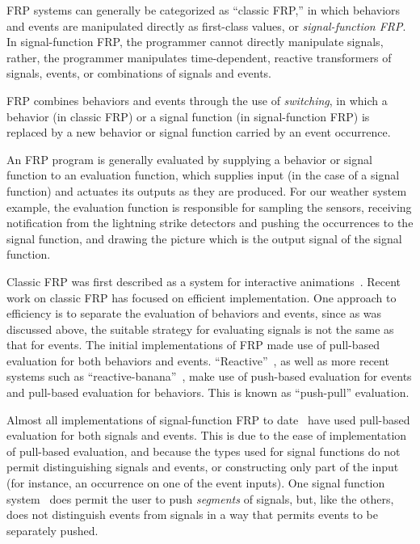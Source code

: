 FRP systems can generally be categorized as ``classic FRP,'' in which behaviors
and events are manipulated directly as first-class values,
or {\em signal-function FRP}. In signal-function FRP, the programmer cannot
directly manipulate signals, rather, the programmer manipulates time-dependent,
reactive transformers of signals, events, or combinations of signals and events.

FRP combines behaviors and events through the use of {\em switching}, in which
a behavior (in classic FRP) or a signal function (in signal-function FRP) is
replaced by a new behavior or signal function carried by an event occurrence.

An FRP program is generally evaluated by supplying a behavior or signal function
to an evaluation function, which supplies input (in the case of a signal
function) and actuates its outputs as they are produced. For our weather system
example, the evaluation function is responsible for sampling the sensors,
receiving notification from the lightning strike detectors and pushing the
occurrences to the signal function, and drawing the picture which is the output
signal of the signal function.

Classic FRP was first described as a system for interactive animations~\cite{Elliott1997}.
Recent work on classic FRP has focused on efficient implementation. One approach
to efficiency is to separate the evaluation of behaviors and events, since
as was discussed above, the suitable strategy for evaluating signals is not the
same as that for events. The initial implementations of FRP made use of
pull-based evaluation for both behaviors and events.
``Reactive''~\cite{Elliott2009}, as well as more recent systems such as
``reactive-banana''~\cite{Apfelmus}, make use of push-based evaluation for
events and pull-based evaluation for behaviors. This is known as ``push-pull''
evaluation.

Almost all implementations of signal-function FRP to
date~\cite{Courtney2001-1,Nilsson2002,Nilsson2005,Sculthorpe2011} have used
pull-based evaluation for both signals and events. This is due to the ease of
implementation of pull-based evaluation, and because the types used for signal
functions do not permit distinguishing signals and events, or constructing only
part of the input (for instance, an occurrence on one of the event inputs). One
signal function system~\cite{Jeffrey2012} does permit the user to push
{\em segments} of signals, but, like the others, does not distinguish events
from signals in a way that permits events to be separately pushed.

